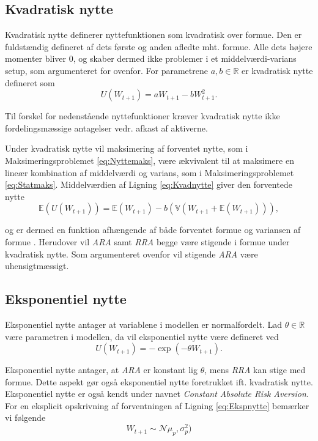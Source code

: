 \documentclass[
  a4paper,
  oneside]{memoir}
\begin{document}
\hypertarget{kvadratisk-nytte}{%
\subsection{Kvadratisk nytte}\label{kvadratisk-nytte}}

Kvadratisk nytte definerer nyttefunktionen som kvadratisk over formue. Den er fuldstændig defineret af dets første og anden afledte mht. formue. Alle dets højere momenter bliver \(0\), og skaber dermed ikke problemer i et middelværdi-varians setup, som argumenteret for ovenfor. For parametrene \(a,b\in\mathbb{R}\) er kvadratisk nytte defineret som
\begin{equation}
U(W_{t+1})=aW_{t+1}-bW_{t+1}^2. \label{eq:Kvadnytte}
\end{equation}

Til forskel for nedenstående nyttefunktioner kræver kvadratisk nytte ikke fordelingsmæssige antagelser vedr. afkast af aktiverne.

Under kvadratisk nytte vil maksimering af forventet nytte, som i Maksimeringsproblemet \eqref{eq:Nyttemaks}, være ækvivalent til at maksimere en lineær kombination af middelværdi og varians, som i Maksimeringsproblemet \eqref{eq:Statmaks}. Middelværdien af Ligning \eqref{eq:Kvadnytte} giver den forventede nytte
\[\mathbb{E}(U(W_{t+1}))=\mathbb{E}(W_{t+1})-b(\mathbb{V}(W_{t+1}+\mathbb{E}(W_{t+1}))),\]

og er dermed en funktion afhængende af både forventet formue og variansen af formue \citep{Munk2017}. Herudover vil \emph{ARA} samt \emph{RRA} begge være stigende i formue under kvadratisk nytte. Som argumenteret ovenfor vil stigende \emph{ARA} være uhensigtmæssigt.

\hypertarget{eksponentiel-nytte}{%
\subsection{Eksponentiel nytte}\label{eksponentiel-nytte}}

Eksponentiel nytte antager at variablene i modellen er normalfordelt. Lad \(\theta\in\mathbb{R}\) være parametren i modellen, da vil eksponentiel nytte være defineret ved
\begin{equation}
U(W_{t+1})=-\exp\left(-\theta W_{t+1}\right). \label{eq:Ekspnytte}
\end{equation}

Eksponentiel nytte antager, at \emph{ARA} er konstant lig \(\theta\), mens \emph{RRA} kan stige med formue. Dette aspekt gør også eksponentiel nytte foretrukket ift. kvadratisk nytte. Eksponentiel nytte er også kendt under navnet \emph{Constant Absolute Risk Aversion}. For en eksplicit opskrivning af forventningen af Ligning \eqref{eq:Ekspnytte} bemærker vi følgende
\[W_{t+1}\sim \mathcal{N}\mu_p,\sigma_p^2)\]
\end{document}
